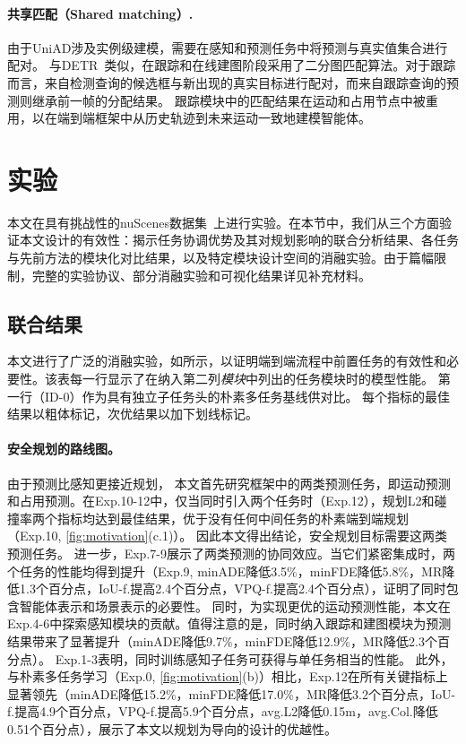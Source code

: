 \documentclass[10pt,twocolumn,letterpaper]{article}
\begin{document}
\vspace{-4pt}
\paragraph{共享匹配（Shared matching）.} 由于UniAD涉及实例级建模，需要在感知和预测任务中将预测与真实值集合进行配对。
%
与DETR~\cite{carion2020detr,li2022panopticseg}类似，在跟踪和在线建图阶段采用了二分图匹配算法。对于跟踪而言，来自检测查询的候选框与新出现的真实目标进行配对，而来自跟踪查询的预测则继承前一帧的分配结果。
%
跟踪模块中的匹配结果在运动和占用节点中被重用，以在端到端框架中从历史轨迹到未来运动一致地建模智能体。


\section{实验}
\label{sec:experiments}
\vspace{-4pt}

本文在具有挑战性的nuScenes数据集~\cite{caesar2020nuscenes}上进行实验。在本节中，我们从三个方面验证本文设计的有效性：揭示任务协调优势及其对规划影响的联合分析结果、各任务与先前方法的模块化对比结果，以及特定模块设计空间的消融实验。由于篇幅限制，完整的实验协议、部分消融实验和可视化结果详见补充材料。

\subsection{联合结果}
\label{sec:exp-joint}
\vspace{-4pt}
本文进行了广泛的消融实验，如所示，以证明端到端流程中前置任务的有效性和必要性。该表每一行显示了在纳入第二列\textit{模块}中列出的任务模块时的模型性能。
第一行（ID-0）作为具有独立子任务头的朴素多任务基线供对比。
每个指标的最佳结果以粗体标记，次优结果以加下划线标记。

\vspace{-4pt}
\paragraph{安全规划的路线图。}
由于预测比感知更接近规划，
本文首先研究框架中的两类预测任务，即运动预测和占用预测。在Exp.10-12中，仅当同时引入两个任务时（Exp.12），规划L2和碰撞率两个指标均达到最佳结果，优于没有任何中间任务的朴素端到端规划（Exp.10, \cref{fig:motivation}(c.1)）。
%
因此本文得出结论，安全规划目标需要这两类预测任务。
%
进一步，Exp.7-9展示了两类预测的协同效应。当它们紧密集成时，两个任务的性能均得到提升（Exp.9, minADE降低3.5\%，minFDE降低5.8\%，MR降低1.3个百分点，IoU-f.提高2.4个百分点，VPQ-f.提高2.4个百分点），证明了同时包含智能体表示和场景表示的必要性。
%
同时，为实现更优的运动预测性能，本文在Exp.4-6中探索感知模块的贡献。值得注意的是，同时纳入跟踪和建图模块为预测结果带来了显著提升（minADE降低9.7\%，minFDE降低12.9\%，MR降低2.3个百分点）。
%
Exp.1-3表明，同时训练感知子任务可获得与单任务相当的性能。
%
此外，与朴素多任务学习（Exp.0, \cref{fig:motivation}(b)）相比，Exp.12在所有关键指标上显著领先（minADE降低15.2\%，minFDE降低17.0\%，MR降低3.2个百分点，IoU-f.提高4.9个百分点，VPQ-f.提高5.9个百分点，avg.L2降低0.15m，avg.Col.降低0.51个百分点），展示了本文以规划为导向的设计的优越性。
\end{document}
